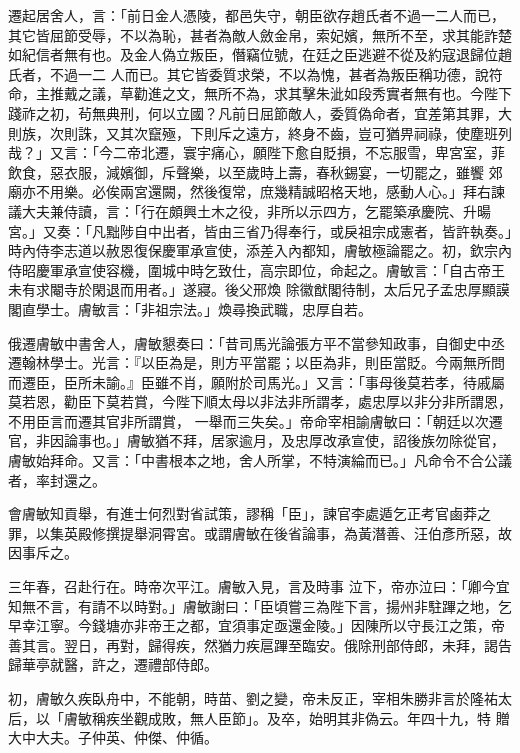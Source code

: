\begin{pinyinscope}
 遷起居舍人，言：「前日金人憑陵，都邑失守，朝臣欲存趙氏者不過一二人而已，其它皆屈節受辱，不以為恥，甚者為敵人斂金帛，索妃嬪，無所不至，求其能詐楚如紀信者無有也。及金人偽立叛臣，僭竊位號，在廷之臣逃避不從及約寇退歸位趙氏者，不過一二
 人而已。其它皆委質求榮，不以為愧，甚者為叛臣稱功德，說符命，主推戴之議，草勸進之文，無所不為，求其擊朱泚如段秀實者無有也。今陛下踐祚之初，茍無典刑，何以立國？凡前日屈節敵人，委質偽命者，宜差第其罪，大則族，次則誅，又其次竄殛，下則斥之遠方，終身不齒，豈可猶畀祠祿，使塵班列哉？」又言：「今二帝北遷，寰宇痛心，願陛下愈自貶損，不忘服雪，卑宮室，菲飲食，惡衣服，減嬪御，斥聲樂，以至歲時上壽，春秋錫宴，一切罷之，雖饗
 郊廟亦不用樂。必俟兩宮還闕，然後復常，庶幾精誠昭格天地，感動人心。」拜右諫議大夫兼侍讀，言：「行在頗興土木之役，非所以示四方，乞罷築承慶院、升暘宮。」又奏：「凡黜陟自中出者，皆由三省乃得奉行，或戾祖宗成憲者，皆許執奏。」時內侍李志道以赦恩復保慶軍承宣使，添差入內都知，膚敏極論罷之。初，欽宗內侍昭慶軍承宣使容機，圍城中時乞致仕，高宗即位，命起之。膚敏言：「自古帝王未有求閹寺於閑退而用者。」遂寢。後父邢煥
 除徽猷閣待制，太后兄子孟忠厚顯謨閣直學士。膚敏言：「非祖宗法。」煥尋換武職，忠厚自若。



 俄遷膚敏中書舍人，膚敏懇奏曰：「昔司馬光論張方平不當參知政事，自御史中丞遷翰林學士。光言：『以臣為是，則方平當罷；以臣為非，則臣當貶。今兩無所問而遷臣，臣所未諭。』臣雖不肖，願附於司馬光。」又言：「事母後莫若孝，待戚屬莫若恩，勸臣下莫若賞，今陛下順太母以非法非所謂孝，處忠厚以非分非所謂恩，不用臣言而遷其官非所謂賞，
 一舉而三失矣。」帝命宰相諭膚敏曰：「朝廷以次遷官，非因論事也。」膚敏猶不拜，居家逾月，及忠厚改承宣使，詔後族勿除從官，膚敏始拜命。又言：「中書根本之地，舍人所掌，不特演綸而已。」凡命令不合公議者，率封還之。



 會膚敏知貢舉，有進士何烈對省試策，謬稱「臣」，諫官李處遁乞正考官鹵莽之罪，以集英殿修撰提舉洞霄宮。或謂膚敏在後省論事，為黃潛善、汪伯彥所惡，故因事斥之。



 三年春，召赴行在。時帝次平江。膚敏入見，言及時事
 泣下，帝亦泣曰：「卿今宜知無不言，有請不以時對。」膚敏謝曰：「臣頃嘗三為陛下言，揚州非駐蹕之地，乞早幸江寧。今錢塘亦非帝王之都，宜須事定亟還金陵。」因陳所以守長江之策，帝善其言。翌日，再對，歸得疾，然猶力疾扈蹕至臨安。俄除刑部侍郎，未拜，謁告歸華亭就醫，許之，遷禮部侍郎。



 初，膚敏久疾臥舟中，不能朝，時苗、劉之變，帝未反正，宰相朱勝非言於隆祐太后，以「膚敏稱疾坐觀成敗，無人臣節」。及卒，始明其非偽云。年四十九，特
 贈大中大夫。子仲英、仲傑、仲循。




\end{pinyinscope}
